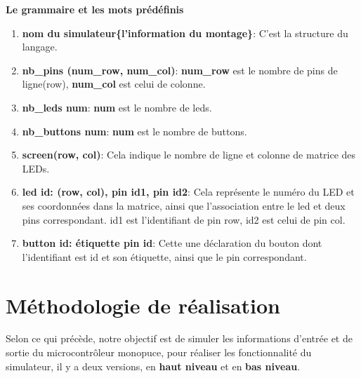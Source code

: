 \documentclass[14px]{article}
\begin{document}
\begin{figure}[htbp]
\end{figure}

\textbf{Le grammaire et les mots prédéfinis}
\begin{enumerate}
    \item \textbf{nom du simulateur\{l'information du montage\}}: C'est la structure du langage.
    \item \textbf{nb\_pins (num\_row, num\_col)}: \textbf{num\_row} est le nombre de pins de ligne(row), \textbf{num\_col} est celui de colonne.
    \item \textbf{nb\_leds num}: \textbf{num} est le nombre de leds.
    \item \textbf{nb\_buttons num}: \textbf{num} est le nombre de buttons.
    \item \textbf{screen(row, col)}: Cela indique le nombre de ligne et colonne de matrice des LEDs.
    \item \textbf{led id: (row, col), pin id1, pin id2}: Cela représente le numéro du LED et ses coordonnées dans la matrice, ainsi que l'association entre le led et deux pins correspondant. id1 est l'identifiant de pin row, id2 est celui de pin col.
    \item \textbf{button id: étiquette pin id}: Cette une déclaration du bouton dont l'identifiant est id et son étiquette, ainsi que le pin correspondant.
\end{enumerate}

\clearpage
\pagestyle{fancy}
\rhead{\thepage}
\fancyfoot{}

\clearpage

\section{Méthodologie de réalisation}
Selon ce qui précède, notre objectif est de simuler les informations d'entrée et de sortie du microcontrôleur monopuce, pour réaliser les fonctionnalité du simulateur, il y a deux versions, en \textbf{haut niveau} et en \textbf{bas niveau}.
\end{document}
